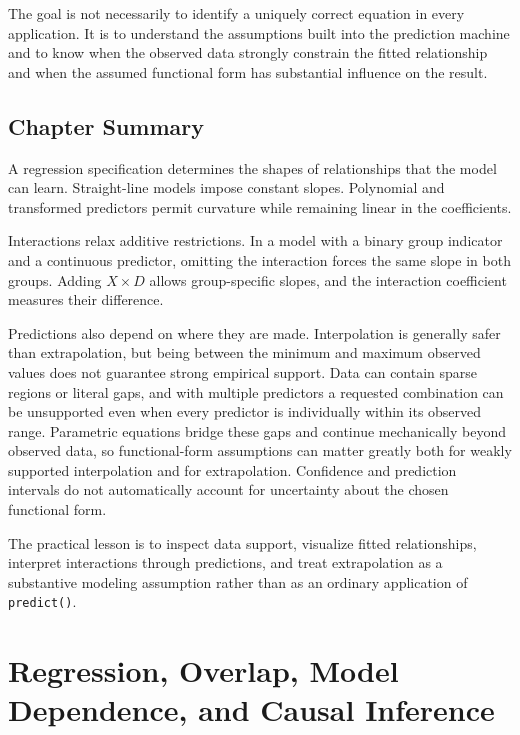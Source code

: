\documentclass[11pt]{report}
\begin{document}
The goal is not necessarily to identify a uniquely correct equation in every application. It is to understand the assumptions built into the prediction machine and to know when the observed data strongly constrain the fitted relationship and when the assumed functional form has substantial influence on the result.

\section{Chapter Summary}

A regression specification determines the shapes of relationships that the model can learn. Straight-line models impose constant slopes. Polynomial and transformed predictors permit curvature while remaining linear in the coefficients.

Interactions relax additive restrictions. In a model with a binary group indicator and a continuous predictor, omitting the interaction forces the same slope in both groups. Adding \(X\times D\) allows group-specific slopes, and the interaction coefficient measures their difference.

Predictions also depend on where they are made. Interpolation is generally safer than extrapolation, but being between the minimum and maximum observed values does not guarantee strong empirical support. Data can contain sparse regions or literal gaps, and with multiple predictors a requested combination can be unsupported even when every predictor is individually within its observed range. Parametric equations bridge these gaps and continue mechanically beyond observed data, so functional-form assumptions can matter greatly both for weakly supported interpolation and for extrapolation. Confidence and prediction intervals do not automatically account for uncertainty about the chosen functional form.

The practical lesson is to inspect data support, visualize fitted relationships, interpret interactions through predictions, and treat extrapolation as a substantive modeling assumption rather than as an ordinary application of \texttt{predict()}.



\chapter{Regression, Overlap, Model Dependence, and Causal Inference}
\label{chap:causal_bridge}
\end{document}
